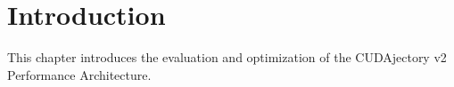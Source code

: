 \chapter{Introduction}
This chapter introduces the evaluation and optimization of the CUDAjectory v2 Performance Architecture.


